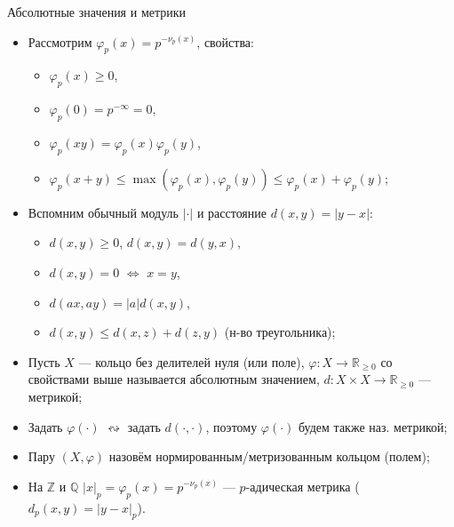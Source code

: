 \documentclass[serif, aspectratio=169]{beamer}
\begin{document}
\begin{frame}{Абсолютные значения и метрики}
    \begin{itemize}
        \item Рассмотрим $\varphi_p(x)=p^{-\nu_p(x)}$, свойства:
        \begin{itemize}
            \item $\varphi_p(x)\geqslant 0$,
            \item $\varphi_p(0)=p^{-\infty}=0$,
            \item $\varphi_p(xy)=\varphi_p(x)\varphi_p(y)$,
            \item $\varphi_p(x+y)\leqslant\max(\varphi_p(x),\varphi_p(y))\leqslant \varphi_p(x)+\varphi_p(y)$;
        \end{itemize}
        \item Вспомним обычный модуль $|\cdot|$ и расстояние $d(x,y)=|y-x|$:
        \begin{itemize}
            \item {} $d(x,y)\geqslant 0$, $d(x,y)=d(y,x)$,
            \item {} $d(x,y) = 0$ $\Leftrightarrow$ $x=y$,
            \item {} $d(ax,ay) = |a|d(x,y)$,
            \item {} $d(x,y) \leqslant d(x,z)+d(z,y)$ (н-во треугольника);
        \end{itemize}
        \item Пусть $X$ --- кольцо без делителей нуля (или поле), $\varphi: X\to \mathbb{R}_{\geqslant 0}$ со свойствами выше называется абсолютным значением, $d:X\times X \to \mathbb{R}_{\geqslant 0}$ --- метрикой;
        \item Задать $\varphi(\cdot)$ $\leftrightsquigarrow$ задать $d(\cdot,\cdot)$, поэтому $\varphi(\cdot)$ будем также наз. метрикой;
        \item Пару $(X,\varphi)$ назовём нормированным/метризованным кольцом (полем);
        \item На $\mathbb{Z}$ и $\mathbb{Q}$ $|x|_p=\varphi_p(x)=p^{-\nu_p(x)}$ --- $p$-адическая метрика ($d_p(x,y)=|y-x|_p$).
    \end{itemize}
    
\end{frame}
\end{document}
